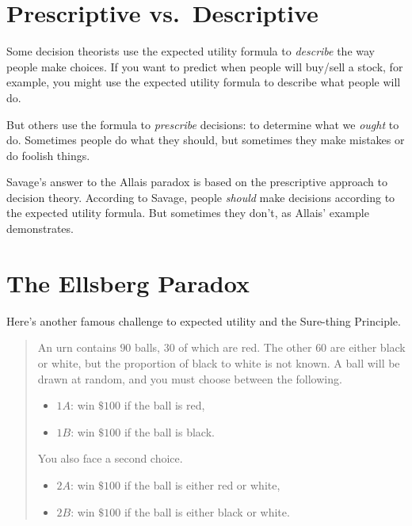 \documentclass[justified]{tufte-book}
\providecommand{\tightlist}{%
  \setlength{\itemsep}{0pt}\setlength{\parskip}{0pt}}
\newenvironment{puzzle}{\begin{quote}\normalsize}{\end{quote}}
\theoremstyle{definition}
\theoremstyle{definition}
\theoremstyle{definition}
\theoremstyle{definition}
\theoremstyle{remark}
\begin{document}
\hypertarget{prescriptive-vs.-descriptive}{%
\section{Prescriptive vs.~Descriptive}\label{prescriptive-vs.-descriptive}}

Some decision theorists use the expected utility formula to \emph{describe} the way people make choices. If you want to predict when people will buy/sell a stock, for example, you might use the expected utility formula to describe what people will do.

But others use the formula to \emph{prescribe} decisions: to determine what we \emph{ought} to do. Sometimes people do what they should, but sometimes they make mistakes or do foolish things.

Savage's answer to the Allais paradox is based on the prescriptive approach to decision theory. According to Savage, people \emph{should} make decisions according to the expected utility formula. But sometimes they don't, as Allais' example demonstrates.

\hypertarget{the-ellsberg-paradox}{%
\section{The Ellsberg Paradox}\label{the-ellsberg-paradox}}

Here's another famous challenge to expected utility and the Sure-thing Principle.

\begin{puzzle}
An urn contains \(90\) balls, \(30\) of which are red. The other \(60\)
are either black or white, but the proportion of black to white is not
known. A ball will be drawn at random, and you must choose between the
following.

\begin{itemize}
\tightlist
\item
  \(1A\): win \(\$100\) if the ball is red,
\item
  \(1B\): win \(\$100\) if the ball is black.
\end{itemize}

You also face a second choice.

\begin{itemize}
\tightlist
\item
  \(2A\): win \(\$100\) if the ball is either red or white,
\item
  \(2B\): win \(\$100\) if the ball is either black or white.
\end{itemize}
\end{puzzle}
\end{document}
